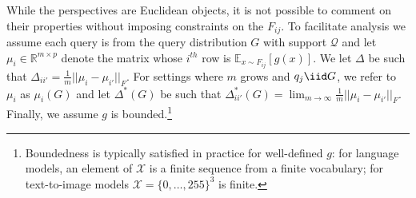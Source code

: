 While the perspectives are Euclidean objects, it is not possible to comment on their properties without imposing constraints on the $ F_{ij} $.
To facilitate analysis we assume each query is from the query distribution $ G $ with support $ \mathscr{Q} $  
and let $ \mu_{i} \in \mathbb{R}^{m \times p} $ denote the matrix whose $ i^{th}$ row is $ \mathbb{E}_{x \sim F_{ij}}\left[g(x)\right]$. 
We let $ \Delta $ be such that $ \Delta_{ii'} = \frac{1}{m}||\mu_{i} - \mu_{i'}||_{F} $.
For settings where $ m $ grows and $ q_{j} \iid G $, we refer to $ \mu_{i} $ as $ \mu_{i}(G) $ and let $ \Delta^{*}(G) $ be such that $ \Delta^{*}_{i i'}(G) = \lim_{m \to \infty} \frac{1}{m} || \mu_{i} - \mu_{i'}||_{F} $.
Finally, we assume $ g $ is bounded.\footnote{Boundedness is typically satisfied in practice for well-defined $ g $: for language models, an element of $ \mathcal{X} $ is a finite sequence from a finite vocabulary; for text-to-image models $ \mathcal{X} = \{0, \hdots, 255\}^{3}$ is finite.

} 

